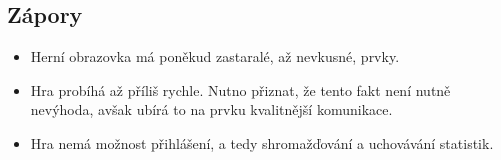 \subsection*{Zápory}

\begin{itemize}
    \item Herní obrazovka má poněkud zastaralé, až nevkusné, prvky.
    \item Hra probíhá až příliš rychle.
Nutno přiznat, že tento fakt není nutně nevýhoda,
avšak ubírá to na prvku kvalitnější komunikace.
    \item Hra nemá možnost přihlášení,
a tedy shromažďování a uchovávání statistik.
\end{itemize}
